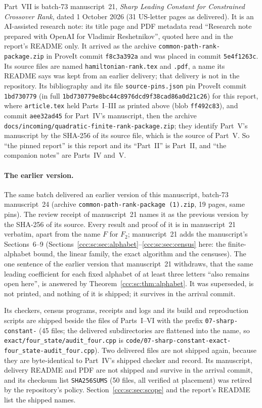 \documentclass[11pt,letterpaper]{article}
\theoremstyle{definition}
\theoremstyle{remark}
\begin{document}
Part~VII is batch-73 manuscript~21, \emph{Sharp Leading Constant for
Constrained Crossover Rank}, dated 1 October 2026 (31 US-letter pages as
delivered). It is an AI-assisted research note: its title page and PDF
metadata read ``Research note prepared with OpenAI for Vladimir
Reshetnikov'', quoted here and in the report's README only. It arrived as the
archive \texttt{common-path-rank-package.zip} in ProveIt commit
\texttt{f8c3a392a} and was placed in commit \texttt{5e4f1263c}. Its source
files are named \texttt{hamiltonian-rank.tex} and \texttt{.pdf}, a name its
README says was kept from an earlier delivery; that delivery is not in the
repository. Its bibliography and its file \texttt{source-pins.json} pin
ProveIt commit \texttt{1bd730779} (in full
\nolinkurl{1bd730779e8bc44c8976dcd9f38cad86a0d21c26}) for this report, where
\texttt{article.tex} held Parts~I--III as printed above (blob
\texttt{ff492c83}), and commit \texttt{aee32ad45} for Part~IV's manuscript,
then the archive \texttt{docs/incoming/quadratic-finite-rank-package.zip};
they identify Part~V's manuscript by the SHA-256 of its source file, which is
the source of Part~V. So ``the pinned report'' is this report and its
``Part~II'' is Part~II, and ``the companion notes'' are Parts~IV and~V.

\paragraph{The earlier version.} The same batch delivered an earlier version
of this manuscript, batch-73 manuscript~24 (archive
\texttt{common-path-rank-package~(1).zip}, 19 pages, same pins). The review
receipt of manuscript~21 names it as the previous version by the SHA-256 of
its source. Every result and proof of it is in manuscript~21 verbatim,
apart from the name $F$ for $F_2$; manuscript~21 adds the manuscript's
Sections~6--9 (Sections~\ref{ccc:sc:sec:alphabet}--\ref{ccc:sc:sec:census}
here: the finite-alphabet bound, the linear family, the exact algorithm and
the censuses). The one sentence of the earlier version that manuscript~21
withdraws, that the same leading coefficient for each fixed alphabet of at
least three letters ``also remains open here'', is answered by
Theorem~\ref{ccc:sc:thm:alphabet}. It was superseded, is not printed, and
nothing of it is shipped; it survives in the arrival commit.

Its checkers, census programs, receipts and logs and its build and
reproduction scripts are shipped beside the files of Parts~I--VI with the
prefix \nolinkurl{07-sharp-constant-} (45 files; the delivered
subdirectories are flattened into the name, so
\texttt{exact/four\_state/audit\_four.cpp} is
\nolinkurl{code/07-sharp-constant-exact-four_state-audit_four.cpp}). Two
delivered files are not shipped again, because they are byte-identical to
Part~IV's shipped checker and record. Its manuscript, delivery README and
PDF are not shipped and survive in the arrival commit, and its checksum list
\texttt{SHA256SUMS} (50 files, all verified at placement) was retired by the
repository's policy. Section~\ref{ccc:sc:sec:scope} and the report's README
list the shipped names.
\end{document}
